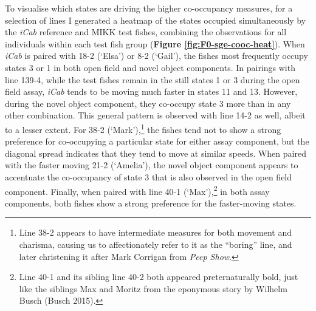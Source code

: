 \documentclass[
]{book}
\begin{document}
To visualise which states are driving the higher co-occupancy measures, for a selection of lines I generated a heatmap of the states occupied simultaneously by the \emph{\textcolor{iCab_424B4D}{iCab}} reference and MIKK test fishes, combining the observations for all individuals within each test fish group (\textbf{Figure \ref{fig:F0-sge-cooc-heat}}). When \emph{\textcolor{iCab_424B4D}{iCab}} is paired with \textcolor{18-2 (‘Elsa’)_FF66A6}{18-2 (‘Elsa’)} or \textcolor{8-2 (‘Gail’)_FF699C}{8-2 (‘Gail’)}, the fishes most frequently occupy states 3 or 1 in both open field and novel object components. In pairings with line \textcolor{139-4_FF61CC}{139-4}, while the test fishes remain in the still states 1 or 3 during the open field assay, \emph{\textcolor{iCab_424B4D}{iCab}} tends to be moving much faster in states 11 and 13. However, during the novel object component, they co-occupy state 3 more than in any other combination. This general pattern is observed with line \textcolor{14-2_F066EA}{14-2} as well, albeit to a lesser extent. For \textcolor{38-2 (‘Mark’)_00C08B}{38-2 (‘Mark’)},\footnote{Line 38-2 appears to have intermediate measures for both movement and charisma, causing us to affectionately refer to it as the ``boring'' line, and later christening it after Mark Corrigan from \emph{Peep Show}.} the fishes tend not to show a strong preference for co-occupying a particular state for either assay component, but the diagonal spread indicates that they tend to move at similar speeds. When paired with the faster moving \textcolor{21-2 (‘Amelia’)_49B500}{21-2 (‘Amelia’)}, the novel object component appears to accentuate the co-occupancy of state 3 that is also observed in the open field component. Finally, when paired with line \textcolor{40-1 (‘Max’)_93AA00}{40-1 (‘Max’)},\footnote{Line 40-1 and its sibling line 40-2 both appeared preternaturally bold, just like the siblings Max and Moritz from the eponymous story by Wilhelm Busch (Busch 2015).} in both assay components, both fishes show a strong preference for the faster-moving states.
\end{document}
